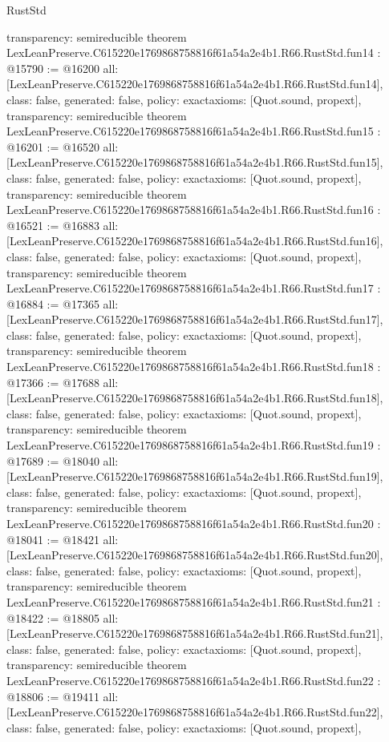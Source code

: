 \begin{lexlean}{RustStd}
\begin{coremodule}
{  transparency: semireducible
}
theorem LexLeanPreserve.C615220e1769868758816f61a54a2e4b1.R66.RustStd.fun14 : @15790 := @16200 {
  all: [LexLeanPreserve.C615220e1769868758816f61a54a2e4b1.R66.RustStd.fun14],
  class: false,
  generated: false,
  policy: exact{axioms: [Quot.sound, propext]},
  transparency: semireducible
}
theorem LexLeanPreserve.C615220e1769868758816f61a54a2e4b1.R66.RustStd.fun15 : @16201 := @16520 {
  all: [LexLeanPreserve.C615220e1769868758816f61a54a2e4b1.R66.RustStd.fun15],
  class: false,
  generated: false,
  policy: exact{axioms: [Quot.sound, propext]},
  transparency: semireducible
}
theorem LexLeanPreserve.C615220e1769868758816f61a54a2e4b1.R66.RustStd.fun16 : @16521 := @16883 {
  all: [LexLeanPreserve.C615220e1769868758816f61a54a2e4b1.R66.RustStd.fun16],
  class: false,
  generated: false,
  policy: exact{axioms: [Quot.sound, propext]},
  transparency: semireducible
}
theorem LexLeanPreserve.C615220e1769868758816f61a54a2e4b1.R66.RustStd.fun17 : @16884 := @17365 {
  all: [LexLeanPreserve.C615220e1769868758816f61a54a2e4b1.R66.RustStd.fun17],
  class: false,
  generated: false,
  policy: exact{axioms: [Quot.sound, propext]},
  transparency: semireducible
}
theorem LexLeanPreserve.C615220e1769868758816f61a54a2e4b1.R66.RustStd.fun18 : @17366 := @17688 {
  all: [LexLeanPreserve.C615220e1769868758816f61a54a2e4b1.R66.RustStd.fun18],
  class: false,
  generated: false,
  policy: exact{axioms: [Quot.sound, propext]},
  transparency: semireducible
}
theorem LexLeanPreserve.C615220e1769868758816f61a54a2e4b1.R66.RustStd.fun19 : @17689 := @18040 {
  all: [LexLeanPreserve.C615220e1769868758816f61a54a2e4b1.R66.RustStd.fun19],
  class: false,
  generated: false,
  policy: exact{axioms: [Quot.sound, propext]},
  transparency: semireducible
}
theorem LexLeanPreserve.C615220e1769868758816f61a54a2e4b1.R66.RustStd.fun20 : @18041 := @18421 {
  all: [LexLeanPreserve.C615220e1769868758816f61a54a2e4b1.R66.RustStd.fun20],
  class: false,
  generated: false,
  policy: exact{axioms: [Quot.sound, propext]},
  transparency: semireducible
}
theorem LexLeanPreserve.C615220e1769868758816f61a54a2e4b1.R66.RustStd.fun21 : @18422 := @18805 {
  all: [LexLeanPreserve.C615220e1769868758816f61a54a2e4b1.R66.RustStd.fun21],
  class: false,
  generated: false,
  policy: exact{axioms: [Quot.sound, propext]},
  transparency: semireducible
}
theorem LexLeanPreserve.C615220e1769868758816f61a54a2e4b1.R66.RustStd.fun22 : @18806 := @19411 {
  all: [LexLeanPreserve.C615220e1769868758816f61a54a2e4b1.R66.RustStd.fun22],
  class: false,
  generated: false,
  policy: exact{axioms: [Quot.sound, propext]},
}
\end{coremodule}
\end{lexlean}
